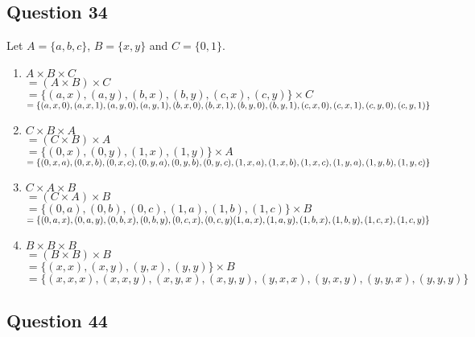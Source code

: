 \documentclass[12pt]{article}
\begin{document}
\subsection*{Question 34}


Let $A = \{ a, b, c \}$, $B = \{ x, y \}$ and $C = \{ 0, 1 \}$.

\begin{enumerate}[label=(\alph*)]
  \item $A \times B \times C$ \\
    $= (A \times B) \times C$ \\
    $= \{(a, x), (a, y), (b, x), (b, y), (c, x), (c, y)\} \times C$ \\
    $= \{(a, x, 0), (a, x, 1), (a, y, 0), (a, y, 1), (b, x, 0), (b, x, 1), \\
    (b, y, 0), (b, y, 1), (c, x, 0), (c, x, 1), (c, y, 0), (c, y, 1)\}$
  \item $C \times B \times A$ \\
    $= (C \times B) \times A$ \\
    $= \{(0, x), (0, y), (1, x), (1, y)\} \times A$ \\
    $= \{(0, x, a), (0, x, b), (0, x, c), (0, y, a), (0, y, b), (0, y, c), \\
    (1, x, a), (1, x, b), (1, x, c), (1, y, a), (1, y, b), (1, y, c)\}$
  \item $C \times A \times B$ \\
    $= (C \times A) \times B$ \\
    $= \{(0, a), (0, b), (0, c), (1, a), (1, b), (1, c)\} \times B$ \\
    $= \{(0, a, x), (0, a, y), (0, b, x), (0, b, y), (0, c, x), (0, c, y) \\
    (1, a, x), (1, a, y), (1, b, x), (1, b, y), (1, c, x), (1, c, y)\}$
  \item $B \times B \times B$ \\
    $= (B \times B) \times B$ \\
    $= \{(x, x), (x, y), (y, x), (y, y)\} \times B$ \\
    $= \{(x, x, x), (x, x, y), (x, y, x), (x, y, y), (y, x, x), (y, x, y),  
    (y, y, x), (y, y, y)\}$
\end{enumerate}

\subsection*{Question 44}
\end{document}
